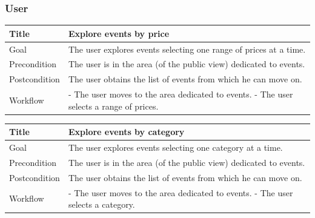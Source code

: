 \documentclass{beamer}
\begin{document}
\begin{frame}
    \frametitle{User}
    \begin{table}
        \tiny
        \begin{tabular}{|p{2cm}|p{6cm}|}
        \hline
        Title & \textbf{Explore events by price} \\
        \hline
        Goal & The user explores events selecting one range of prices at a time. \\
        \hline
        Precondition & The user is in the area (of the public view) dedicated to events.\\
        \hline
        Postcondition & The user obtains the list of events from which he can move on.\\
        \hline
        Workflow &
        - The user moves to the area dedicated to events. \newline
        - The user selects a range of prices. \\
        \hline
        \end{tabular}
\end{table}

\begin{table}
    \tiny
    \begin{tabular}{|p{2cm}|p{6cm}|}
    \hline
    Title & \textbf{Explore events by category} \\
    \hline
    Goal & The user explores events selecting one category at a time. \\
    \hline
    Precondition & The user is in the area (of the public view) dedicated to events.\\
    \hline
    Postcondition & The user obtains the list of events from which he can move on.\\
    \hline
    Workflow &
    - The user moves to the area dedicated to events. \newline
    - The user selects a category. \\
    \hline
    \end{tabular}
\end{table}
\end{frame}


\end{document}
